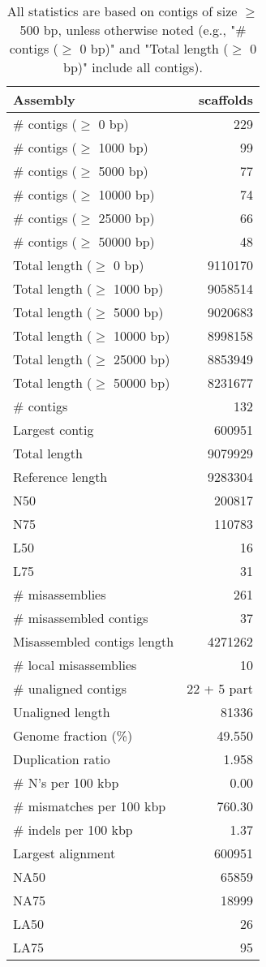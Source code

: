 \documentclass[12pt,a4paper]{article}
\begin{document}
\begin{table}[ht]
\begin{center}
\caption{All statistics are based on contigs of size $\geq$ 500 bp, unless otherwise noted (e.g., "\# contigs ($\geq$ 0 bp)" and "Total length ($\geq$ 0 bp)" include all contigs).}
\begin{tabular}{|l*{1}{|r}|}
\hline
Assembly & scaffolds \\ \hline
\# contigs ($\geq$ 0 bp) & 229 \\ \hline
\# contigs ($\geq$ 1000 bp) & 99 \\ \hline
\# contigs ($\geq$ 5000 bp) & 77 \\ \hline
\# contigs ($\geq$ 10000 bp) & 74 \\ \hline
\# contigs ($\geq$ 25000 bp) & 66 \\ \hline
\# contigs ($\geq$ 50000 bp) & 48 \\ \hline
Total length ($\geq$ 0 bp) & 9110170 \\ \hline
Total length ($\geq$ 1000 bp) & 9058514 \\ \hline
Total length ($\geq$ 5000 bp) & 9020683 \\ \hline
Total length ($\geq$ 10000 bp) & 8998158 \\ \hline
Total length ($\geq$ 25000 bp) & 8853949 \\ \hline
Total length ($\geq$ 50000 bp) & 8231677 \\ \hline
\# contigs & 132 \\ \hline
Largest contig & 600951 \\ \hline
Total length & 9079929 \\ \hline
Reference length & 9283304 \\ \hline
N50 & 200817 \\ \hline
N75 & 110783 \\ \hline
L50 & 16 \\ \hline
L75 & 31 \\ \hline
\# misassemblies & 261 \\ \hline
\# misassembled contigs & 37 \\ \hline
Misassembled contigs length & 4271262 \\ \hline
\# local misassemblies & 10 \\ \hline
\# unaligned contigs & 22 + 5 part \\ \hline
Unaligned length & 81336 \\ \hline
Genome fraction (\%) & 49.550 \\ \hline
Duplication ratio & 1.958 \\ \hline
\# N's per 100 kbp & 0.00 \\ \hline
\# mismatches per 100 kbp & 760.30 \\ \hline
\# indels per 100 kbp & 1.37 \\ \hline
Largest alignment & 600951 \\ \hline
NA50 & 65859 \\ \hline
NA75 & 18999 \\ \hline
LA50 & 26 \\ \hline
LA75 & 95 \\ \hline
\end{tabular}
\end{center}
\end{table}
\end{document}
